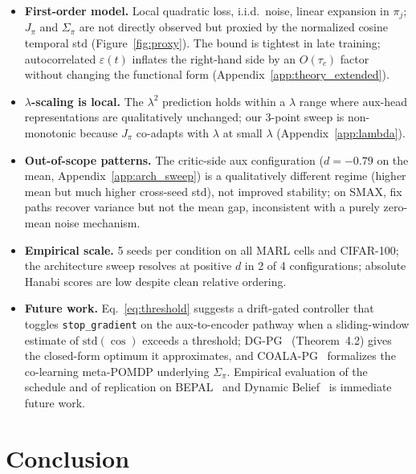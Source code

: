 \documentclass{article}
\theoremstyle{plain}
\theoremstyle{definition}
\theoremstyle{remark}
\begin{document}
\begin{itemize}
\item \textbf{First-order model.} Local quadratic loss, i.i.d.\
noise, linear expansion in $\pi_j$; $J_\pi$ and $\Sigma_\pi$ are
not directly observed but proxied by the normalized cosine temporal
std (Figure~\ref{fig:proxy}). The bound is tightest in late training;
autocorrelated $\varepsilon(t)$ inflates the right-hand side by an
$O(\tau_c)$ factor without changing the functional form
(Appendix~\ref{app:theory_extended}).
\item \textbf{$\lambda$-scaling is local.} The $\lambda^2$
prediction holds within a $\lambda$ range where aux-head
representations are qualitatively unchanged; our 3-point sweep
is non-monotonic because $J_\pi$ co-adapts with $\lambda$ at
small $\lambda$ (Appendix~\ref{app:lambda}).
\item \textbf{Out-of-scope patterns.} The critic-side aux
configuration ($d = -0.79$ on the mean, Appendix~\ref{app:arch_sweep})
is a qualitatively different regime (higher mean but much higher
cross-seed std), not improved stability; on SMAX, fix paths recover
variance but not the mean gap, inconsistent with a purely zero-mean
noise mechanism.
\item \textbf{Empirical scale.} 5 seeds per condition on all MARL
cells and CIFAR-100; the architecture sweep resolves at positive
$d$ in 2 of 4 configurations; absolute Hanabi scores are low despite
clean relative ordering.
\item \textbf{Future work.} Eq.~\eqref{eq:threshold} suggests a
drift-gated controller that toggles \texttt{stop\_gradient} on the
aux-to-encoder pathway when a sliding-window estimate of
$\mathrm{std}(\cos)$ exceeds a threshold; DG-PG~\cite{yang2026dgpg}
(Theorem~4.2) gives the closed-form optimum it approximates, and
COALA-PG~\cite{meulemans2024coala} formalizes the co-learning
meta-POMDP underlying $\Sigma_\pi$. Empirical evaluation of the
schedule and of replication on BEPAL~\cite{huang2025bepal} and
Dynamic Belief~\cite{zhai2023dynamic} is immediate future work.
\end{itemize}


\section{Conclusion}
\label{sec:conclusion}
\end{document}
